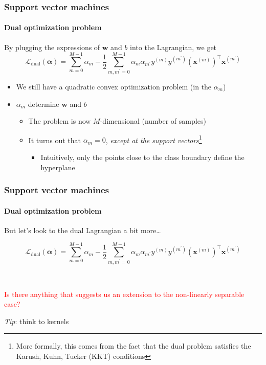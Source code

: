 \documentclass[aspectratio=43]{beamer}
\begin{document}
\begin{frame}
  \frametitle{Support vector machines}
  \framesubtitle{Dual optimization problem}

  By plugging the expressions of $\mathbf{w}$ and $b$ into the Lagrangian, we get
  \[\mathcal{L}_{\mathrm{dual}}\left( \mathbf{\alpha} \right) = \sum_{m=0}^{M-1}\alpha_m - \frac{1}{2}\sum_{m,m^\prime=0}^{M-1}\alpha_m\alpha_{m^\prime}y^{(m)}y^{(m^\prime)}\left( \mathbf{x}^{(m)} \right)^\top \mathbf{x}^{(m^\prime)}\]

  \begin{itemize}
    \item<2-> We still have a quadratic convex optimization problem (in the $\alpha_m$)
    \item<3-> $\alpha_m$ determine $\mathbf{w}$ and $b$
    \begin{itemize}
      \item<4-> The problem is now $M$-dimensional (number of samples)
      \item<5-> It turns out that $\alpha_m=0$, \emph{except at the support vectors}\footnote{More formally, this comes from the fact that the dual problem satisfies the Karush, Kuhn, Tucker (KKT) conditions}
      \begin{itemize}
        \item Intuitively, only the points close to the class boundary define the hyperplane
      \end{itemize}
    \end{itemize}
  \end{itemize}

\end{frame}


\begin{frame}
  \frametitle{Support vector machines}
  \framesubtitle{Dual optimization problem}
  
  But let's look to the dual Lagrangian a bit more\dots

  \[\mathcal{L}_{\mathrm{dual}}\left( \mathbf{\alpha} \right) = \sum_{m=0}^{M-1}\alpha_m - \frac{1}{2}\sum_{m,m^\prime=0}^{M-1}\alpha_m\alpha_{m^\prime}y^{(m)}y^{(m^\prime)}\left( \mathbf{x}^{(m)} \right)^\top \mathbf{x}^{(m^\prime)}\]

  \ \\
  \pause
  \begin{center}
    \textcolor{red}{Is there anything that suggests us an extension to the non-linearly separable case?}

    \pause
    \emph{Tip}: think to kernels
  \end{center}

  
\end{frame}
\end{document}
